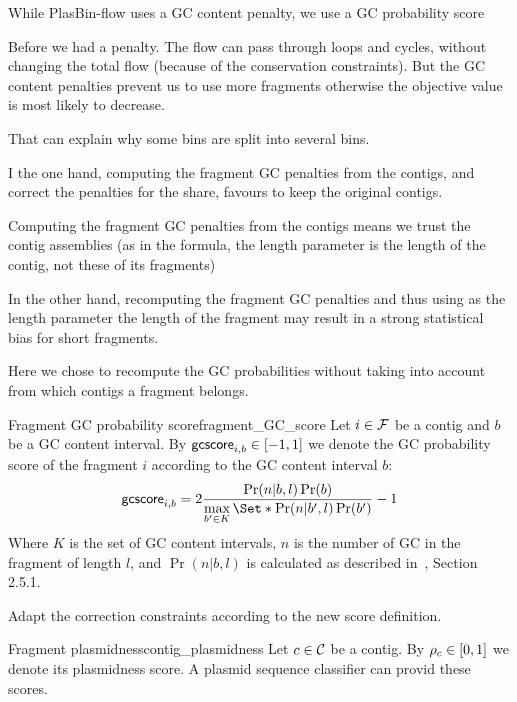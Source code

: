 \begin{newfeatbox}
  While PlasBin-flow uses a GC content penalty, we use a GC probability score

  \begin{questionbox}
    Before we had a penalty.
    The flow can pass through loops and cycles, without changing the total flow (because of the conservation constraints). But the GC content penalties prevent us to use more fragments otherwise the objective value is most likely to decrease.

    That can explain why some bins are split into several bins.
  \end{questionbox}

  \begin{questionbox}
    I the one hand, computing the fragment GC penalties from the contigs, and correct the penalties for the share, favours to keep the original contigs.

    Computing the fragment GC penalties from the contigs means we trust the contig assemblies (as in the formula, the length parameter is the length of the contig, not these of its fragments)

    In the other hand, recomputing the fragment GC penalties and thus using as the length parameter the length of the fragment may result in a strong statistical bias for short fragments.

    \begin{notebox}
      Here we chose to recompute the GC probabilities without taking into account from which contigs a fragment belongs.
    \end{notebox}
  \end{questionbox}
\end{newfeatbox}

\begin{definition}{Fragment GC probability score}{fragment_GC_score}
  Let \(i \in \mathcal{F}{}\) be a contig and \(b\) be a GC content interval.
  By \(\mathsf{gcscore}_{i, b} \in [-1, 1]\) we denote the GC probability score of the fragment \(i\) according to the GC content interval \(b\):
  \[
    \gcscore{i}{b} = 2 \frac{\Pr(n|b,l)\Pr(b)}{\max\limits_{b' \in K}\Set*{\Pr(n|b',l)\Pr(b')}} - 1
  \]
  Where \(K\) is the set of GC content intervals, \(n\) is the number of GC in the fragment of length \(l\), and \(\Pr(n|b,l)\) is calculated as described in~\cite{manePlasBinflowFlowbasedMILP2023}, Section 2.5.1.

  \begin{fixmebox}
    Adapt the correction constraints according to the new score definition.
  \end{fixmebox}
\end{definition}

\begin{definition}{Fragment plasmidness}{contig_plasmidness}
  Let \(c \in \mathcal{C}{}\) be a contig.
  By \(\rho_{c} \in [0, 1]\) we denote its plasmidness score.
  A plasmid sequence classifier can provid these scores.
\end{definition}
